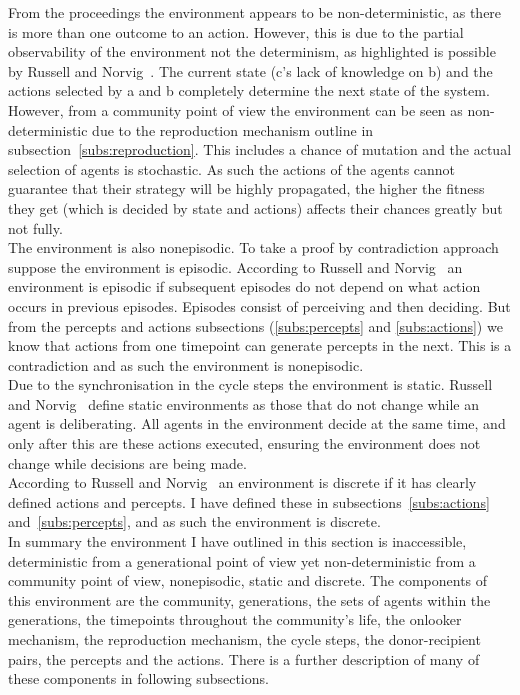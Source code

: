 \documentclass[]{final_report}
\begin{document}
From the proceedings the environment appears to be non-deterministic, as there is more than one outcome to an action. However, this is due to the partial observability of the environment not the determinism, as highlighted is possible by Russell and Norvig~\cite{russell2016artificial}. The current state (c's lack of knowledge on b) and the actions selected by a and b completely determine the next state of the system.\\
However, from a community point of view the environment can be seen as non-deterministic due to the reproduction mechanism outline in subsection~\ref{subs:reproduction}. This includes a chance of mutation and the actual selection of agents is stochastic. As such the actions of the agents cannot guarantee that their strategy will be highly propagated, the higher the fitness they get (which is decided by state and actions) affects their chances greatly but not fully.\\
The environment is also nonepisodic. To take a proof by contradiction approach suppose the environment is episodic. According to Russell and Norvig~\cite{russell2016artificial} an environment is episodic if subsequent episodes do not depend on what action occurs in previous episodes. Episodes consist of perceiving and then deciding. But from the percepts and actions subsections (\ref{subs:percepts} and \ref{subs:actions}) we know that actions from one timepoint can generate percepts in the next. This is a contradiction and as such the environment is nonepisodic.\\
Due to the synchronisation in the cycle steps the environment is static. Russell and Norvig~\cite{russell2016artificial} define static environments as those that do not change while an agent is deliberating. All agents in the environment decide at the same time, and only after this are these actions executed, ensuring the environment does not change while decisions are being made.\\
According to Russell and Norvig~\cite{russell2016artificial} an environment is discrete if it has clearly defined actions and percepts. I have defined these in subsections~\ref{subs:actions} and~\ref{subs:percepts}, and as such the environment is discrete.\\
In summary the environment I have outlined in this section is inaccessible, deterministic from a generational point of view yet non-deterministic from a community point of view, nonepisodic, static and discrete. The components of this environment are the community, generations, the sets of agents within the generations, the timepoints throughout the community's life, the onlooker mechanism, the reproduction mechanism, the cycle steps, the donor-recipient pairs, the percepts and the actions. There is a further description of many of these components in following subsections.
\end{document}
